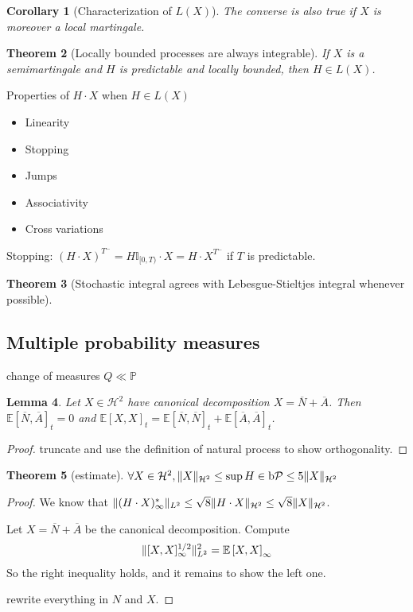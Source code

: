 \documentclass[openany,oneside]{book}
\newtheorem{thm}{Theorem}[section]
\newtheorem{lem}[thm]{Lemma}
\newtheorem{cor}[thm]{Corollary}
\theoremstyle{definition}
\theoremstyle{remark}
\newcommand{\E}{\mathbb{E}} %
\renewcommand{\P}{\mathbb{P}} %
\newcommand{\I}{\mathbb{I}} %
\DeclarePairedDelimiter{\norm}{\lVert}{\rVert} %
\newcommand{\sH}[1][2]{\mathcal{H}^{#1}} %
\newcommand{\pred}{\mathcal{P}} %
\newcommand{\bP}{\mathrm{b}\pred} %
\begin{document}

\begin{cor}[Characterization of $L(X)$]
The converse is also true if $X$ is moreover a local martingale.
\end{cor}

\begin{thm}[Locally bounded processes are always integrable]
If $X$ is a semimartingale and $H$ is predictable and locally bounded, then $H\in L(X)$.
\end{thm}

Properties of $H\cdot X$ when $H\in L(X)$
\begin{itemize}
\item Linearity
\item Stopping
\item Jumps
\item Associativity
\item Cross variations
\end{itemize}

Stopping: $(H\cdot X)^{T^-} = H\I_{[0,T)}\cdot X = H\cdot X^{T^-}$ if $T$ is predictable.

\par
\begin{thm}[Stochastic integral agrees with Lebesgue-Stieltjes integral whenever possible]
\end{thm}

\subsection{Multiple probability measures}
change of measures $Q \ll \P$

\begin{lem}
Let $X\in \sH$ have canonical decomposition $X=\overline{N}+\overline{A}$. Then $\E\left[\overline{N},\overline{A}\right]_t = 0$ and $\E\left[X,X\right]_t = \E\left[\overline{N},\overline{N}\right]_t + \E\left[\overline{A},\overline{A}\right]_t$.
\end{lem}
\begin{proof}
truncate and use the definition of natural process to show orthogonality.
\end{proof}

\begin{thm}[estimate]
$\forall X\in \sH, \norm{X}_{\sH} \le \sup{H\in\bP} \le 5\norm{X}_{\sH}$
\end{thm}
\begin{proof}
We know that $\norm{(H\cdot X)^\ast_\infty}_{L^2} \le \sqrt{8} \norm{H\cdot X}_{\sH} \le \sqrt{8}\norm{X}_{\sH}$.
\par
Let $X=\overline{N}+\overline{A}$ be the canonical decomposition. Compute
\begin{align*}
\norm{[X,X]^{1/2}_\infty}^2_{L^2} &= \E\left[X,X\right]_\infty \\
\end{align*}
So the right inequality holds, and it remains to show the left one.
\par
rewrite everything in $N$ and $X$.
\end{proof}
\end{document}

